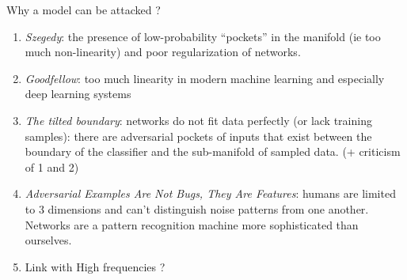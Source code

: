 \documentclass{beamer}
\begin{document}
\begin{frame}{Why a model can be attacked ?}
    \begin{enumerate}
        \item \textit{Szegedy}: the presence of low-probability “pockets” in the manifold (ie too much non-linearity) and poor regularization of networks.
        \item \textit{Goodfellow}: too much linearity in modern machine learning and especially deep learning systems
        \item \textit{The tilted boundary}: networks do not fit data perfectly (or lack training samples): there are adversarial pockets of inputs that exist between the boundary of the classifier and the sub-manifold of sampled data. (+ criticism of 1 and 2)
        \item \textit{Adversarial Examples Are Not Bugs, They Are Features}: humans are limited to 3 dimensions and can’t distinguish noise patterns from one another. Networks are a pattern recognition machine more sophisticated than ourselves.
        \item Link with High frequencies ?
    \end{enumerate}
\end{frame}

\end{document}
